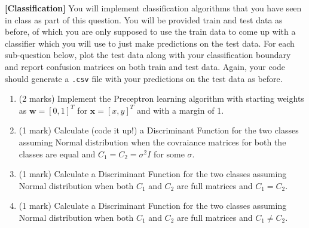 \documentclass[addpoints,12pt,solution]{exam}
\begin{document}
\begin{questions}
\begin{enumerate}[label=(\alph*)]
\begin{solution}

\end{solution}

\end{enumerate}


\question \textbf{[Classification]} You will implement classification algorithms that you have seen in class as part of this question. You will be provided train and test data as before, of which you are only supposed to use the train data to come up with a classifier which you will use to just make predictions on the test data. For each sub-question below, plot the test data along with your classification boundary and report confusion matrices on both train and test data. Again, your code should generate a \texttt{.csv} file with your predictions on the test data as before.

\begin{enumerate}[label=(\alph*)]

\item (2 marks) Implement the Preceptron learning algorithm with starting weights as $\mathbf{w} = [0, 1]^T$ for $\mathbf{x} = [x, y]^T$ and with a margin of 1. 

\begin{solution}

\end{solution}

\item (1 mark) Calculate (code it up!) a Discriminant Function for the two classes assuming Normal distribution when the covraiance matrices for both the classes are equal and $C_1 = C_2 = \sigma^2 I$ for some $\sigma$.

\begin{solution}

\end{solution}

\item (1 mark) Calculate a Discriminant Function for the two classes assuming Normal distribution when both $C_1$ and $C_2$ are full matrices and $C_1 = C_2$.

\begin{solution}

\end{solution}

\item (1 mark) Calculate a Discriminant Function for the two classes assuming Normal distribution when both $C_1$ and $C_2$ are full matrices and $C_1 \neq C_2$.


\end{enumerate}
\end{questions}
\end{document}
